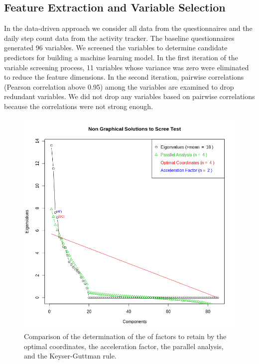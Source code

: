 \documentclass[preprint,12pt]{elsarticle}
\begin{document}
\subsection{Feature Extraction and Variable Selection}

\par
 In the data-driven approach we consider all data from the questionnaires and  the daily step count data from the activity tracker. The baseline questionnaires generated 96 variables. We screened the variables to determine candidate predictors for building a machine learning model. In the first iteration of the variable screening process, 11 variables whose variance was zero were eliminated to reduce the feature dimensions. In the second iteration, pairwise correlations (Pearson correlation above 0.95) among the variables are examined to drop redundant variables. We did not drop any variables based on pairwise correlations because the correlations were not strong enough.
 

\begin{figure}[H]
\centering\includegraphics[width=0.5\linewidth]{NOn_graphical.png}
\caption{Comparison  of  the  determination  of  the  of  factors  to  retain  by  the  optimal  coordinates,  the  acceleration  factor,  the  parallel  analysis,  and  the  Keyser-Guttman rule.} 
\label{fig:3}
\end{figure}
\end{document}
